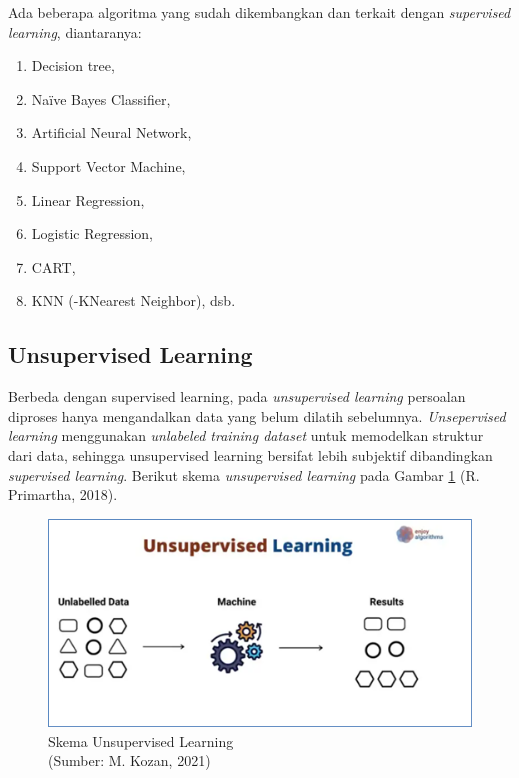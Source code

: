 Ada beberapa algoritma yang sudah dikembangkan dan terkait dengan \textit{supervised learning}, diantaranya:
\begin{enumerate}
	\item Decision tree,
	\item Naïve Bayes Classifier,
	\item Artificial Neural Network,
	\item Support Vector Machine,
	\item Linear Regression,
	\item Logistic Regression,
	\item CART,
	\item KNN (-KNearest Neighbor), dsb.
\end{enumerate}

\subsection{Unsupervised Learning}
\hspace{1,2cm}Berbeda dengan supervised learning, pada \textit{unsupervised learning} persoalan diproses hanya mengandalkan data yang belum dilatih sebelumnya. \textit{Unsepervised learning} menggunakan \textit{unlabeled training dataset} untuk memodelkan struktur dari data, sehingga unsupervised learning bersifat lebih subjektif dibandingkan \textit{supervised learning}. Berikut skema \textit{unsupervised learning} pada Gambar \ref{img:Skema-Unsupervised-Learning} (R. Primartha, 2018).

\begin{figure}[H]
	\vspace{-0.1cm}
	\begin{center}
		\includegraphics[width=1\columnwidth]{bab2/Gambar/Picture9.png}
	\end{center}
	\vspace{-0.2cm}
	\caption{Skema Unsupervised Learning\\(Sumber: M. Kozan, 2021)}\label{img:Skema-Unsupervised-Learning}
\end{figure}

